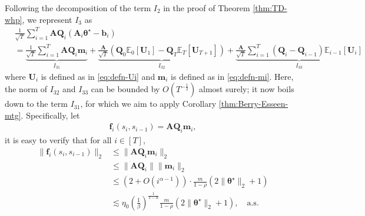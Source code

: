 Following the decomposition of the term $I_2$ in the proof of Theorem \ref{thm:TD-whp}, we represent $I_3$ as
\begin{align*}
&\frac{1}{\sqrt{T}}\sum_{i=1}^T \bm{AQ}_i(\bm{A}_i \bm{\theta}^\star - \bm{b}_i )\\
 &= \underset{I_{31}}{\underbrace{\frac{1}{\sqrt{T}}\sum_{i=1}^T \bm{AQ}_i \bm{m}_i}} + \underset{I_{32}}{\underbrace{\frac{\bm{A}}{\sqrt{T}}(\bm{Q}_0 \mathbb{E}_0[\bm{U}_1] - \bm{Q}_T \mathbb{E}_T [\bm{U}_{T+1}])}}+ \underset{I_{33}}{\underbrace{\frac{\bm{A}}{\sqrt{T}}\sum_{i=1}^T (\bm{Q}_i - \bm{Q}_{i-1})\mathbb{E}_{i-1}[\bm{U}_i]}}
\end{align*}
where $\bm{U}_i$ is defined as in \eqref{eq:defn-Ui} and $\bm{m}_i$ is defined as in \eqref{eq:defn-mi}. Here, the norm of $I_{32}$ and $I_{33}$ can be bounded by $O(T^{-\frac{1}{2}})$ almost surely; it now boils down to the term $I_{31}$, for which we aim to apply Corollary \ref{thm:Berry-Esseen-mtg}. Specifically, let 
\begin{align*}
\bm{f}_i(s_i,s_{i-1}) = \bm{AQ}_i \bm{m}_i,
\end{align*}
it is easy to verify that for all $i \in [T]$,
\begin{align*}
\|\bm{f}_i(s_i,s_{i-1})\|_2 &\leq \|\bm{A}\bm{Q}_i \bm{m}_i\|_2  \\ 
&\leq \|\bm{AQ}_i\|\|\bm{m}_i\|_2\\ 
&\leq (2+O(i^{\alpha-1})) \cdot \frac{m}{1-\rho}(2\|\bm{\theta}^\star\|_2+1)\\ 
&\lesssim \eta_0 \left(\frac{1}{\beta}\right)^{\frac{1}{1-\alpha}}\frac{m}{1-\rho}(2\|\bm{\theta}^\star\|_2+1), \quad \text{a.s.}
\end{align*}
